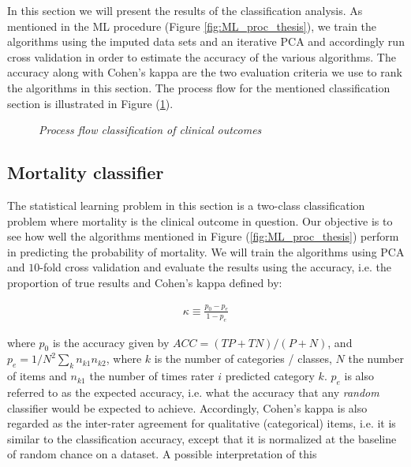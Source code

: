 \documentclass[../thesis.tex]{subfiles}
\begin{document}
\noindent In this section we will present the results of the classification analysis. As mentioned in the ML procedure (Figure \ref{fig:ML_proc_thesis}), we train the algorithms using the imputed data sets and an iterative PCA and accordingly run cross validation in order to estimate the accuracy of the various algorithms. The accuracy along with Cohen’s kappa are the two evaluation criteria we use to rank the algorithms in this section. The process flow for the mentioned classification section is illustrated in Figure (\ref{fig:process_flow_classification}). 

\begin{figure}[!t]
    \centering
    
    \caption[Process flow classification of clinical outcomes]{\textit{Process flow classification of clinical outcomes}}
    \label{fig:process_flow_classification}
\end{figure}

\subsection{Mortality classifier}

\noindent The statistical learning problem in this section is a two-class classification problem where mortality is the clinical outcome in question. Our objective is to see how well the algorithms mentioned in Figure (\ref{fig:ML_proc_thesis}) perform in predicting the probability of mortality. We will train the algorithms using PCA and $10$-fold cross validation and evaluate the results using the accuracy, i.e. the proportion of true results and Cohen's kappa defined by:

\begin{align}
    \kappa \equiv \frac{p_0 - p_e}{1 - p_e}
\end{align}

\noindent where $p_0$ is the accuracy given by ${\mathit  {ACC}}=({\mathit  {TP}}+{\mathit  {TN}})/(P+N)$, and $p_e = 1 / N^2 \sum_{k} n_{k1}n_{k2}$, where $k$ is the number of categories / classes, $N$ the number of items and $n_{k1}$ the number of times rater $i$ predicted category $k$. $p_e$ is also referred to as the expected accuracy, i.e. what the accuracy that any \textit{random} classifier would be expected to achieve. Accordingly, Cohen's kappa is also regarded as the inter-rater agreement for qualitative (categorical) items, i.e. it is similar to the classification accuracy, except that it is normalized at the baseline of random chance on a dataset. A possible interpretation of this    
\end{document}
